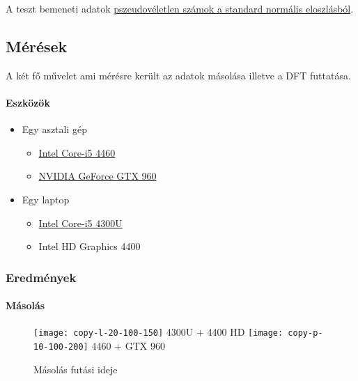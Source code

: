 A teszt bemeneti adatok \href{https://en.cppreference.com/w/cpp/numeric/random/normal_distribution}{pszeudov\'eletlen sz\'amok a standard norm\'alis eloszl\'asb\'ol}.

\subsection{M\'er\'esek}
A k\'et f\H o m\H uvelet ami m\'er\'esre ker\"ult az adatok m\'asol\'asa illetve a DFT futtat\'asa.

\paragraph{Eszk\"oz\"ok}
\begin{itemize}
	\item Egy asztali g\'ep
	\begin{itemize}
		\item \href{https://ark.intel.com/products/80817/Intel-Core-i5-4460-Processor-6M-Cache-up-to-3_40-GHz}
		{Intel Core-i5 4460}
		\item \href{https://www.geforce.com/hardware/desktop-gpus/geforce-gtx-960}
		{NVIDIA GeForce GTX 960}
	\end{itemize}
	\item Egy laptop
	\begin{itemize}
		\item \href{https://ark.intel.com/products/76308/Intel-Core-i5-4300U-Processor-3M-Cache-up-to-2_90-GHz}
		{Intel Core-i5 4300U}
		\item Intel HD Graphics 4400
	\end{itemize}
\end{itemize}

\subsubsection{Eredm\'enyek}



\paragraph{M\'asol\'as}

\begin{figure}[h]
	\texttt{[image: copy-l-20-100-150]}
	{4300U + 4400 HD}
	\texttt{[image: copy-p-10-100-200]}
	{4460 + GTX 960}
	\centering
	\caption{M\'asol\'as fut\'asi ideje}
\end{figure}

